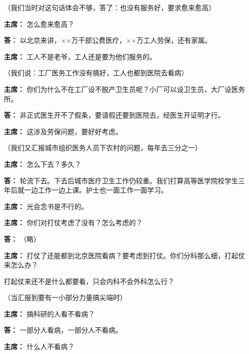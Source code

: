 \begin{list}{}
（我们当时对这句话体会不够，答了：也没有服务好，要求愈来愈高）

\item[\textbf{主席：}] 怎么愈来愈高？

\item[\textbf{答：}] 以北京来讲，××万干部公费医疗，××万工人劳保，还有家属。

\item[\textbf{主席：}] 工人不是老爷，工人还是要为他们服务的。

（我们说：工厂医务工作没有搞好，工人也都到医院去看病）

\item[\textbf{主席：}] 你们为什么不在工厂设不脱产卫生员呢？小厂可以设卫生员，大厂设医务所。

\item[\textbf{答：}] 非正式医生开不了假条，要请假还要到医院去，经医生开证明才行。

\item[\textbf{主席：}] 这涉及劳保问题，要好好考虑。

（我们又汇报城市组织医务人员下农村的问题，每年去三分之一）

\item[\textbf{主席：}] 怎么下去？多久？

\item[\textbf{答：}] 轮流下去。下去后城市医疗卫生工作仍较重。我们打算高等医学院校学生三年后就一边工作一边上课。护士也一面工作一面学习。

\item[\textbf{主席：}] 光会念书是不行的。

\item[\textbf{主席：}] 你们对打仗考虑了没有？怎么考虑的？

\item[\textbf{答：}] （略）

\item[\textbf{主席：}] 打仗了还能都到北京医院看病？要考虑到打仗。你们分科那么细，打起仗来怎么办？

打起仗来还不是什么都要看，只会内科不会外科怎么行？

（当汇报到要有一小部分力量搞尖端时）

\item[\textbf{主席：}] 搞科研的人看不看病？

\item[\textbf{答：}] 一部分人看病，一部分人不看病。

\item[\textbf{主席：}] 什么人不看病？


\end{list}
